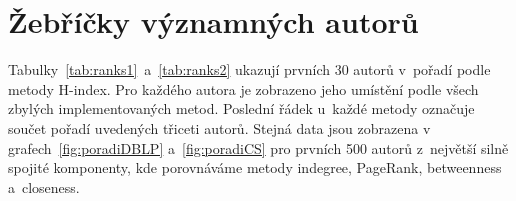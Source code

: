 \documentclass{bakalarka}
\begin{document}

\section{Žebříčky významných autorů}
Tabulky~\ref{tab:ranks1}~a~\ref{tab:ranks2} ukazují prvních 30 autorů v~pořadí
podle metody H-index. Pro každého autora je zobrazeno jeho umístění podle všech
zbylých implementovaných metod. Poslední řádek u~každé metody označuje součet
pořadí uvedených třiceti autorů. Stejná data jsou zobrazena v
grafech~\ref{fig:poradiDBLP} a~\ref{fig:poradiCS} pro prvních 500 autorů
z~největší silně spojité komponenty, kde porovnáváme metody indegree, PageRank,
betweenness a~closeness.
\end{document}
